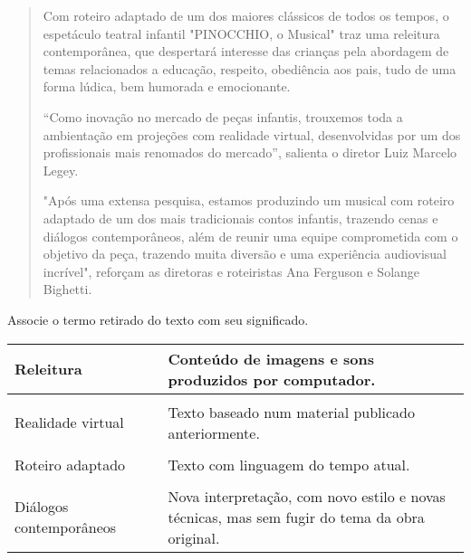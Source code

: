 \begin{quote}
Com roteiro adaptado de um dos maiores clássicos de todos os tempos, o
espetáculo teatral infantil "PINOCCHIO, o Musical" traz uma releitura
contemporânea, que despertará interesse das crianças pela abordagem de
temas relacionados a educação, respeito, obediência aos pais, tudo de
uma forma lúdica, bem humorada e emocionante.

``Como inovação no mercado de peças infantis, trouxemos toda a
ambientação em projeções com realidade virtual, desenvolvidas por um dos
profissionais mais renomados do mercado'', salienta o diretor Luiz
Marcelo Legey.

"Após uma extensa pesquisa, estamos produzindo um musical com roteiro
adaptado de um dos mais tradicionais contos infantis, trazendo cenas e
diálogos contemporâneos, além de reunir uma equipe comprometida com o
objetivo da peça, trazendo muita diversão e uma experiência audiovisual
incrível", reforçam as diretoras e roteiristas Ana Ferguson e Solange
Bighetti.

\end{quote}

Associe o termo retirado do texto com seu significado.

\begin{longtable}[]{@{}lll@{}}
\toprule
Releitura & & Conteúdo de imagens e sons produzidos por
computador.\tabularnewline
\midrule
\endhead
& &\tabularnewline
Realidade virtual & & Texto baseado num material publicado
anteriormente.\tabularnewline
& &\tabularnewline
Roteiro adaptado & & Texto com linguagem do tempo atual.\tabularnewline
& &\tabularnewline
Diálogos contemporâneos & & Nova interpretação, com novo estilo e novas
técnicas, mas sem fugir do tema da obra original.\tabularnewline
\bottomrule
\end{longtable}


